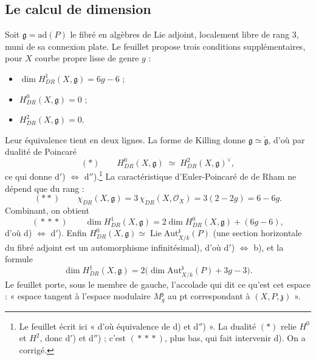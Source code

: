 \documentclass[11pt,a4paper]{article}
\begin{document}
\subsection*{Le calcul de dimension}

Soit $\mathfrak{g} = \mathrm{ad}(P)$ le fibré en algèbres de Lie adjoint,
localement libre de rang $3$, muni de sa connexion plate. Le feuillet propose
trois conditions supplémentaires, pour $X$ courbe propre lisse de genre $g$ :

\begin{itemize}
\item[d)] $\dim H^1_{DR}(X, \mathfrak{g}) = 6g-6$ ;
\item[d$'$)] $H^0_{DR}(X, \mathfrak{g}) = 0$ ;
\item[d$''$)] $H^2_{DR}(X, \mathfrak{g}) = 0$.
\end{itemize}

Leur équivalence tient en deux lignes. La forme de Killing donne
$\mathfrak{g} \simeq \check{\mathfrak{g}}$, d'où par dualité de Poincaré
\[
  (*) \qquad H^0_{DR}(X, \mathfrak{g}) \;\simeq\;
  H^2_{DR}(X, \mathfrak{g})^{\vee},
\]
ce qui donne d$'$) $\Leftrightarrow$ d$''$).\footnote{Le feuillet écrit
ici « d'où équivalence de d) et d$''$) ». La dualité $(*)$ relie $H^0$ et
$H^2$, donc d$'$) et d$''$) ; c'est $(\!*\!*\!*)$, plus bas, qui fait
intervenir d). On a corrigé.} La caractéristique
d'Euler-Poincaré de de Rham ne dépend que du rang :
\[
  (**) \qquad \chi_{DR}(X, \mathfrak{g}) = 3\,\chi_{DR}(X, \mathcal{O}_X)
  = 3(2-2g) = 6-6g .
\]
Combinant, on obtient
\[
  (\!*\!*\!*) \qquad \dim H^1_{DR}(X, \mathfrak{g})
  = 2 \dim H^0_{DR}(X, \mathfrak{g}) + (6g-6),
\]
d'où d) $\Leftrightarrow$ d$'$). Enfin $H^0_{DR}(X, \mathfrak{g}) \simeq
\operatorname{Lie} \mathrm{Aut}^{\mathfrak{z}}_{X/k}(P)$ (une section
horizontale du fibré adjoint est un automorphisme infinitésimal), d'où
d$'$) $\Leftrightarrow$ b), et la formule
\[
  \dim H^1_{DR}(X, \mathfrak{g})
  = 2\Big( \dim \mathrm{Aut}^{\mathfrak{z}}_{X/k}(P) + 3g-3 \Big).
\]
Le feuillet porte, sous le membre de gauche, l'accolade qui dit ce qu'est cet
espace : « espace tangent à l'espace modulaire $M_g^{\mathfrak{z}}$ au pt
correspondant à $(X, P, \mathfrak{z})$ ».
\end{document}
